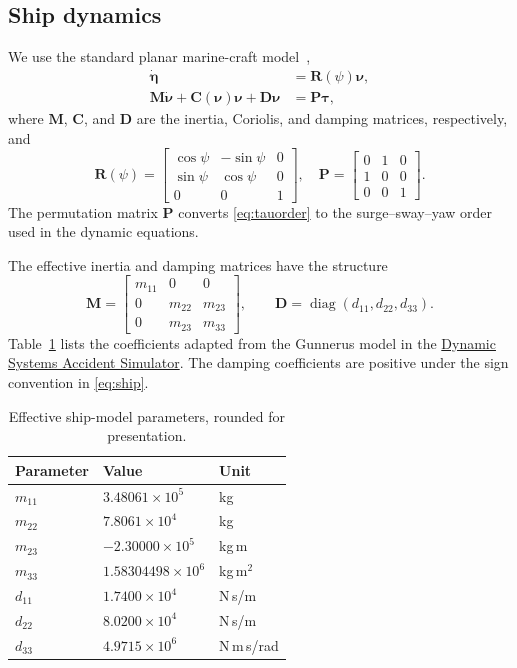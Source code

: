 \documentclass[conference]{IEEEtran}
\DeclareMathOperator{\diag}{diag}
\begin{document}
\subsection{Ship dynamics}
We use the standard planar marine-craft model~\cite{FossenModel},
\begin{align}
 \dot{\bm{\eta}} &= \bm{R}(\psi)\bm{\nu},\\
 \bm{M}\dot{\bm{\nu}}+\bm{C}(\bm{\nu})\bm{\nu}
       +\bm{D}\bm{\nu} &= \bm{P}\bm{\tau},
 \label{eq:ship}
\end{align}
where $\bm M$, $\bm C$, and $\bm D$ are the inertia, Coriolis, and damping
matrices, respectively, and
\begin{equation}
 \bm{R}(\psi)=
 \begin{bmatrix}
 \cos\psi&-\sin\psi&0\\
 \sin\psi& \cos\psi&0\\
 0&0&1
 \end{bmatrix},\quad
 \bm{P}=\begin{bmatrix}0&1&0\\1&0&0\\0&0&1\end{bmatrix}.
\end{equation}
The permutation matrix $\bm P$ converts \eqref{eq:tauorder} to the
surge--sway--yaw order used in the dynamic equations.

The effective inertia and damping matrices have the structure
\begin{equation}
 \bm M=\begin{bmatrix}m_{11}&0&0\\0&m_{22}&m_{23}\\0&m_{23}&m_{33}\end{bmatrix},
 \qquad \bm D=\diag(d_{11},d_{22},d_{33}).
\end{equation}
Table~\ref{tab:ship} lists the coefficients adapted from the Gunnerus model
in the \href{https://github.com/rgmaidana/dysas/blob/master/DYSAS/Vessel.py}{Dynamic Systems Accident Simulator}.
The damping coefficients are positive under the sign convention in
\eqref{eq:ship}.

\begin{table}[t]
\caption{Effective ship-model parameters, rounded for presentation.}
\label{tab:ship}
\centering
\begin{tabular}{lll}
\toprule
Parameter&Value&Unit\\
\midrule
$m_{11}$&$3.48061\times10^5$&kg\\
$m_{22}$&$7.8061\times10^4$&kg\\
$m_{23}$&$-2.30000\times10^5$&kg\,m\\
$m_{33}$&$1.58304498\times10^6$&kg\,m$^2$\\
$d_{11}$&$1.7400\times10^4$&N\,s/m\\
$d_{22}$&$8.0200\times10^4$&N\,s/m\\
$d_{33}$&$4.9715\times10^6$&N\,m\,s/rad\\
\bottomrule
\end{tabular}
\end{table}
\end{document}
